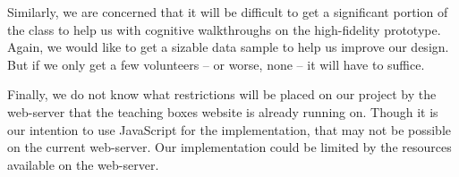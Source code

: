 \documentclass[11pt,letter]{article}
\begin{document}
Similarly, we are concerned that it will be difficult to get a significant
portion of the class to help us with cognitive walkthroughs on the high-fidelity
prototype. Again, we would like to get a sizable data sample to help us improve
our design. But if we only get a few volunteers -- or worse, none -- it will
have to suffice.

Finally, we do not know what restrictions will be placed on our project by the
web-server that the teaching boxes website is already running on. Though it is
our intention to use JavaScript for the implementation, that may not be possible
on the current web-server. Our implementation could be limited by the resources
available on the web-server.
\end{document}
